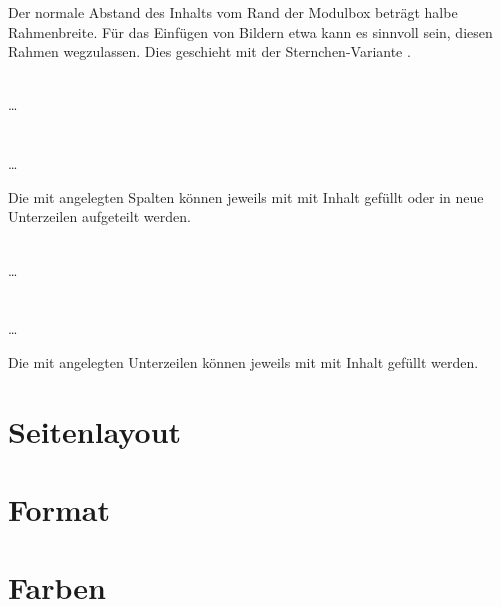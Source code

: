 \documentclass[a4paper,11pt]{tubsreprt}
\begin{document}
Der normale Abstand des Inhalts vom Rand der Modulbox beträgt halbe
Rahmenbreite. Für das Einfügen von Bildern etwa kann es sinnvoll sein,
diesen Rahmen wegzulassen. Dies geschieht mit der Sternchen-Variante
.


\begin{Declaration}
    \\%
  \quad\dots\\
  \\
    \\%
  \quad\dots\\
\end{Declaration}

Die mit  angelegten Spalten können jeweils mit 
 mit Inhalt gefüllt oder in neue Unterzeilen aufgeteilt 
werden.

\begin{Declaration}
  \\%
  \quad\dots\\
  \\
  \\%
  \quad\dots\\
\end{Declaration}

Die mit  angelegten Unterzeilen können jeweils mit 
 mit Inhalt gefüllt werden.

\begin{Example}

\end{Example}

\section{Seitenlayout}



\section{Format}

\section{Farben}
\end{document}
